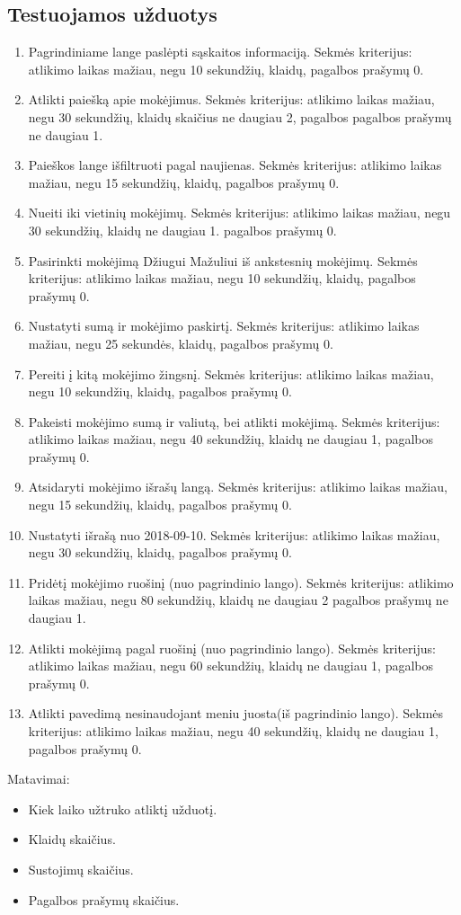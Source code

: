 \documentclass[oneside]{VUMIFPSkursinis}
\begin{document}
\subsection{Testuojamos užduotys}
\begin{enumerate}
	\item Pagrindiniame lange paslėpti sąskaitos informaciją. Sekmės kriterijus: atlikimo laikas mažiau, negu 10 sekundžių, klaidų, pagalbos prašymų 0.
	\item Atlikti paiešką apie mokėjimus. Sekmės kriterijus: atlikimo laikas mažiau, negu 30 sekundžių, klaidų skaičius ne daugiau 2, pagalbos pagalbos prašymų ne daugiau 1.
	\item Paieškos lange išfiltruoti pagal naujienas. Sekmės kriterijus: atlikimo laikas mažiau, negu 15 sekundžių, klaidų, pagalbos prašymų 0.
	\item Nueiti iki vietinių mokėjimų. Sekmės kriterijus: atlikimo laikas mažiau, negu 30 sekundžių, klaidų ne daugiau 1.  pagalbos prašymų 0.
	\item Pasirinkti mokėjimą Džiugui Mažuliui iš ankstesnių mokėjimų. Sekmės kriterijus: atlikimo laikas mažiau, negu 10 sekundžių, klaidų, pagalbos prašymų 0.
	\item Nustatyti sumą ir mokėjimo paskirtį. Sekmės kriterijus: atlikimo laikas mažiau, negu 25 sekundės, klaidų, pagalbos prašymų 0.
	\item Pereiti į kitą mokėjimo žingsnį. Sekmės kriterijus: atlikimo laikas mažiau, negu 10 sekundžių, klaidų, pagalbos prašymų 0.
	\item Pakeisti mokėjimo sumą ir valiutą, bei atlikti mokėjimą. Sekmės kriterijus: atlikimo laikas mažiau, negu 40 sekundžių, klaidų ne daugiau 1, pagalbos prašymų 0.
	\item Atsidaryti mokėjimo išrašų langą. Sekmės kriterijus: atlikimo laikas mažiau, negu 15 sekundžių, klaidų, pagalbos prašymų 0.
	\item Nustatyti išrašą nuo 2018-09-10. Sekmės kriterijus: atlikimo laikas mažiau, negu 30 sekundžių, klaidų, pagalbos prašymų 0.
	\item Pridėtį mokėjimo ruošinį (nuo pagrindinio lango). Sekmės kriterijus: atlikimo laikas mažiau, negu 80 sekundžių, klaidų ne daugiau 2 pagalbos prašymų ne daugiau 1.
	\item Atlikti mokėjimą pagal ruošinį (nuo pagrindinio lango). Sekmės kriterijus: atlikimo laikas mažiau, negu 60 sekundžių, klaidų ne daugiau 1, pagalbos prašymų 0.
	\item Atlikti pavedimą nesinaudojant meniu juosta(iš pagrindinio lango). Sekmės kriterijus: atlikimo laikas mažiau, negu 40 sekundžių, klaidų ne daugiau 1, pagalbos prašymų 0.
\end{enumerate}
Matavimai:
\begin{itemize}
	\item Kiek laiko užtruko atliktį užduotį.
	\item Klaidų skaičius.
	\item Sustojimų skaičius.
	\item Pagalbos prašymų skaičius.
\end{itemize}
\end{document}
